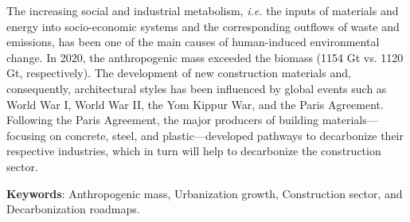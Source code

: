 The increasing social and industrial metabolism, \textit{i.e.} the inputs of materials and energy into socio-economic systems and the corresponding outflows of waste and emissions, has been one of the main causes of human-induced environmental change. In 2020, the anthropogenic mass exceeded the biomass (1154 Gt vs. 1120 Gt, respectively). The development of new construction materials and, consequently, architectural styles has been influenced by global events such as World War I, World War II, the Yom Kippur War, and the Paris Agreement. Following the Paris Agreement, the major producers of building materials—focusing on concrete, steel, and plastic—developed pathways to decarbonize their respective industries, which in turn will help to decarbonize the construction sector.

\vfill

\textbf{Keywords}: Anthropogenic mass, Urbanization growth, Construction sector, and Decarbonization roadmaps.


